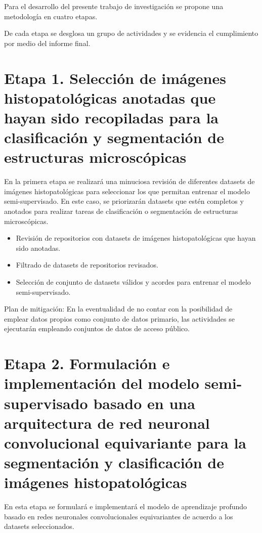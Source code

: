 \documentclass[12pt,letterpaper,final, openany]{scrbook}
\begin{document}
Para el desarrollo del presente trabajo de investigación se propone una metodología en cuatro etapas.

De cada etapa se desglosa un grupo de actividades y se evidencia el cumplimiento por medio del informe final.


\section{Etapa 1. Selección de imágenes histopatológicas anotadas que hayan sido recopiladas para la clasificación y segmentación de estructuras microscópicas}

En la primera etapa se realizará una minuciosa revisión de diferentes datasets de imágenes histopatológicas para seleccionar los que permitan entrenar el modelo semi-supervisado. En este caso, se priorizarán datasets que estén completos y anotados para realizar tareas de clasificación o segmentación de estructuras microscópicas.

\begin{itemize}
    \item Revisión de repositorios con datasets de imágenes histopatológicas que hayan sido anotadas.
    \item Filtrado de datasets de repositorios revisados.
    \item Selección de conjunto de datasets válidos y acordes para entrenar el modelo semi-supervisado.
\end{itemize}

Plan de mitigación: En la eventualidad de no contar con la posibilidad de emplear datos propios como conjunto de datos primario, las actividades se ejecutarán empleando conjuntos de datos de acceso público.

\section{Etapa 2. Formulación e implementación del modelo semi-supervisado basado en una arquitectura de red neuronal convolucional equivariante para la segmentación y clasificación de imágenes histopatológicas}

En esta etapa se formulará e implementará el modelo de aprendizaje profundo basado en redes neuronales convolucionales equivariantes de acuerdo a los datasets seleccionados.
\end{document}
